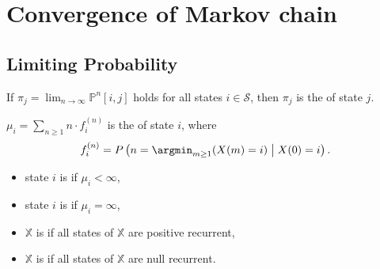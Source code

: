 \section{Convergence of Markov chain}

\subsection{Limiting Probability}

\begin{definition}
If $ \pi_{j} = \lim_{n \to \infty} \mathbb{P}^{n} [i, j] $ holds for all states $ i \in \mathcal{S} $, then $ \pi_{j} $ is the  of state $ j $.

\begin{comment}
If all states $ i $ have limiting probability, then
\[ \lim_{n \to \infty} \mathbb{P}^{n} [i, j] =
\begin{bmatrix}
  \boldsymbol\pi \\ \vdots \\ \boldsymbol\pi
\end{bmatrix}, \]
where $ \boldsymbol\pi $ is the row vector $ (\pi_{1}, \pi_{2}, \cdots) $.
\end{comment}
\end{definition}

\begin{definition}
$ \mu_{i} = \sum_{n \ge 1} n \cdot f_{i}^{(n)} $ is the  of state $ i $, where 
\[ f_{i}^{(n)} = P \left( n = \argmin_{m \ge 1} ( X(m) = i ) \;\middle|\; X(0) = i \right). \]

\begin{itemize}
  \item state $ i $ is  if $ \mu_{i} < \infty $,
  \item state $ i $ is  if $ \mu_{i} = \infty $,
  \item $ \mathbb{X} $ is  if all states of $ \mathbb{X} $ are positive recurrent,
  \item $ \mathbb{X} $ is  if all states of $ \mathbb{X} $ are null recurrent.
\end{itemize}

\begin{comment}
\[ f_{i} = \sum_{n = 0}^{\infty} f_{i}^{(n)} = \text{recurrent probability of state $ i $}. \]
\end{comment}
\end{definition}

